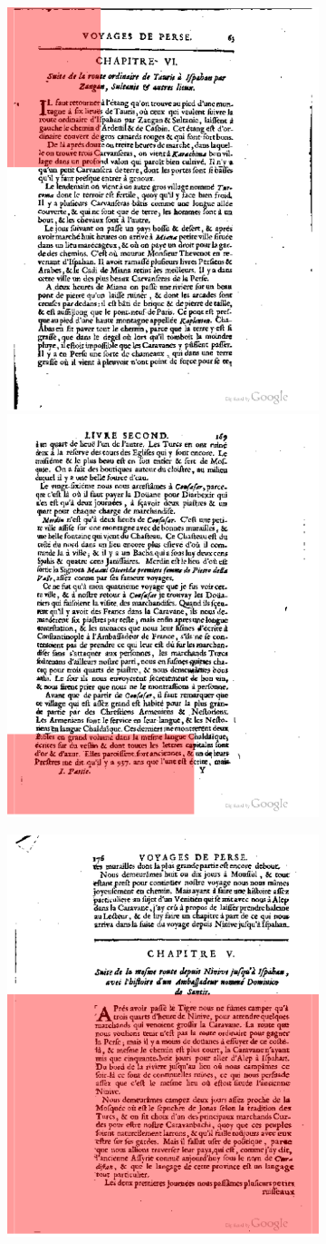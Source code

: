 \begin{figure}[H]
\begin{subfigure}[b]{0.49\textwidth}
	\end{subfigure}
	\begin{subfigure}[b]{0.49\textwidth}
		\includegraphics[width=.49\textwidth]{resources/bad_extract_pic4}
		\includegraphics[width=.49\textwidth]{resources/bad_extract_pic7}
	\end{subfigure}
	\begin{subfigure}[b]{0.49\textwidth}
		\includegraphics[width=.49\textwidth]{resources/bad_extract_pic9}

\end{subfigure}
\end{figure}
